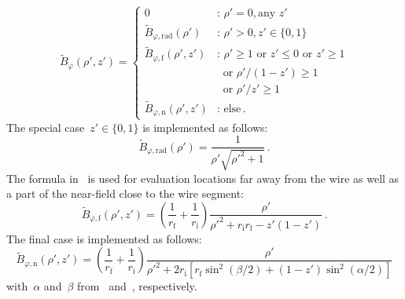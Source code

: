 \begin{equation}
  \tilde{B}_\varphi (\rho', z') =
  \begin{cases}
    0                                            &:\, \rho' = 0 , \textrm{any } z'      \\
    \tilde{B}_{\varphi,\mathrm{rad}} (\rho')     &:\, \rho' > 0, z' \in \{0, 1\} \\
    \tilde{B}_{\varphi,\mathrm{f}}   (\rho', z') &:\, \rho' \geq 1 \textrm{ or } z' \leq 0 \textrm{ or } z' \geq 1 \\
                                            ~    & ~ \textrm{ or } \rho'/(1-z') \geq 1  \\
                                            ~    & ~ \textrm{ or } \rho'/z'   \geq 1 \\
    \tilde{B}_{\varphi,\mathrm{n}}   (\rho', z') &:\, \textrm{else} \, .
  \end{cases}
\end{equation}
The special case~$z' \in \{0, 1\}$ is implemented as follows:
\begin{equation}
  \tilde{B}_{\varphi,\mathrm{rad}} (\rho') = \frac{1}{\rho' \sqrt{{\rho'}^2 + 1}} \, .
\end{equation}
The formula in~ is used for evaluation locations far away from the wire
as well as a part of the near-field close to the wire segment:
\begin{equation}
  \tilde{B}_{\varphi,\mathrm{f}} (\rho', z')
  = \left(\frac{1}{r_\mathrm{f}} + \frac{1}{r_\mathrm{i}} \right)
    \frac{\rho'}{{\rho'}^2 + r_\mathrm{i} r_\mathrm{f} - z' (1 - z')} \, .
\end{equation}
The final case is implemented as follows:
\begin{equation}
  \tilde{B}_{\varphi,\mathrm{n}} (\rho', z')
  = \left(\frac{1}{r_\mathrm{f}} + \frac{1}{r_\mathrm{i}} \right)
    \frac{\rho'}
         {{\rho'}^2 + 2 r_\mathrm{i} \left[ r_\mathrm{f} \sin^2(\beta/2) + (1 - z') \sin^2(\alpha/2) \right]}
\end{equation}
with~$\alpha$ and~$\beta$ from~ and~, respectively.

